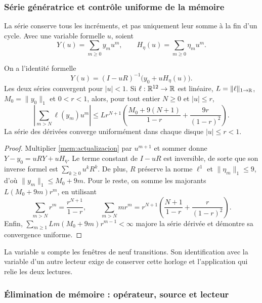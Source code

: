 \subsubsection{Série génératrice et contrôle uniforme de la mémoire}

La série conserve tous les incréments, et pas uniquement leur somme à la fin
d'un cycle. Avec une variable formelle \(u\), soient
\[
 Y(u)=\sum_{m\geq0}y_mu^m,\qquad
 H_\eta(u)=\sum_{m\geq0}\eta_mu^m.
\]

\begin{proposition}
\label{mem:prop-serie}
On a l'identité formelle
\begin{equation}
 Y(u)=(I-uR)^{-1}\bigl(y_0+uH_\eta(u)\bigr).
 \label{mem:serie}
\end{equation}
Les deux séries convergent pour \(|u|<1\). Si \(\ell:\mathbb R^{12}\to\mathbb R\)
est linéaire, \(L=\|\ell\|_{1\to\mathbb R}\), \(M_0=\|y_0\|_1\) et
\(0<r<1\), alors, pour tout entier \(N\geq0\) et \(|u|\leq r\),
\begin{equation}
 \left|\sum_{m>N}\ell(y_m)u^m\right|
 \leq Lr^{N+1}\left(
 \frac{M_0+9(N+1)}{1-r}+\frac{9r}{(1-r)^2}\right).
 \label{mem:cota}
\end{equation}
La série des dérivées converge uniformément dans chaque disque
\(|u|\leq r<1\).
\end{proposition}
\begin{proof}
Multiplier \eqref{mem:actualizacion} par \(u^{m+1}\) et sommer donne
\(Y-y_0=uRY+uH_\eta\). Le terme constant de \(I-uR\) est
inversible, de sorte que son inverse formel est \(\sum_{k\geq0}u^kR^k\).
De plus, \(R\) préserve la norme \(\ell^1\) et
\(\|\eta_m\|_1\leq9\), d'où
\(\|y_m\|_1\leq M_0+9m\).
Pour le reste, on somme les majorants
\(L(M_0+9m)r^m\), en utilisant
\[
 \sum_{m>N}r^m=\frac{r^{N+1}}{1-r},\qquad
 \sum_{m>N}mr^m=r^{N+1}
 \left(\frac{N+1}{1-r}+\frac r{(1-r)^2}\right).
\]
Enfin, \(\sum_{m\geq1}Lm(M_0+9m)r^{m-1}<\infty\)
majore la série dérivée et démontre sa convergence uniforme.
\end{proof}

La variable \(u\) compte les fenêtres de neuf transitions. Son identification
avec la variable d'un autre lecteur exige de conserver cette horloge et l'application
qui relie les deux lectures.

\subsubsection{Élimination de mémoire : opérateur, source et lecteur}

